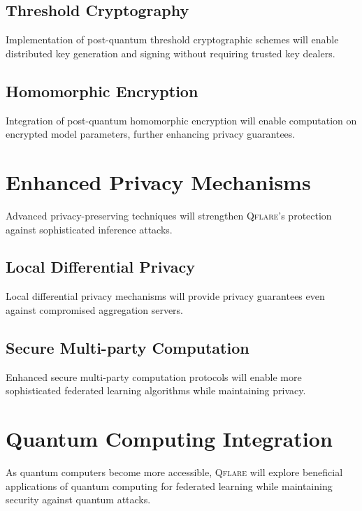 ﻿\documentclass[12pt,a4paper,twoside]{book}
\newcommand{\qflare}{\textsc{Qflare}}
\begin{document}
\subsection{Threshold Cryptography}
\label{subsec:threshold-crypto}

Implementation of post-quantum threshold cryptographic schemes will enable distributed key generation and signing without requiring trusted key dealers.

\subsection{Homomorphic Encryption}
\label{subsec:homomorphic}

Integration of post-quantum homomorphic encryption will enable computation on encrypted model parameters, further enhancing privacy guarantees.

\section{Enhanced Privacy Mechanisms}
\label{sec:enhanced-privacy}

Advanced privacy-preserving techniques will strengthen \qflare{}'s protection against sophisticated inference attacks.

\subsection{Local Differential Privacy}
\label{subsec:local-dp}

Local differential privacy mechanisms will provide privacy guarantees even against compromised aggregation servers.

\subsection{Secure Multi-party Computation}
\label{subsec:smpc}

Enhanced secure multi-party computation protocols will enable more sophisticated federated learning algorithms while maintaining privacy.

\section{Quantum Computing Integration}
\label{sec:quantum-integration}

As quantum computers become more accessible, \qflare{} will explore beneficial applications of quantum computing for federated learning while maintaining security against quantum attacks.
\end{document}
